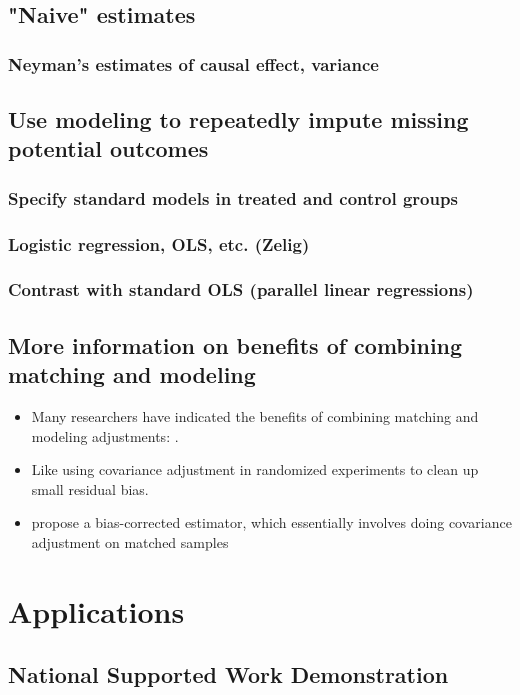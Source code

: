 \documentclass[11pt,titlepage]{article}
\begin{document}
\subsection{"Naive" estimates}
\subsubsection{Neyman's estimates of causal effect, variance}
\subsection{Use modeling to repeatedly impute missing potential outcomes}
\subsubsection{Specify standard models in treated and control groups}
\subsubsection{Logistic regression, OLS, etc. (Zelig)}
\subsubsection{Contrast with standard OLS (parallel linear regressions)}
\subsection{More information on benefits of combining matching and modeling}
\begin{itemize}
\item Many researchers have indicated the benefits of combining
  matching and modeling adjustments: \cite{Rubin73b, RobRot95,
    HecHidTod97, AbaImb04}.
\item Like using covariance adjustment in randomized experiments to
  clean up small residual bias.
\item \cite{AbaImb04} propose a bias-corrected estimator, which
  essentially involves doing covariance adjustment on matched samples
\end{itemize} 

                                                                                                                          
\section{Applications}
\subsection{National Supported Work Demonstration}
\end{document}
